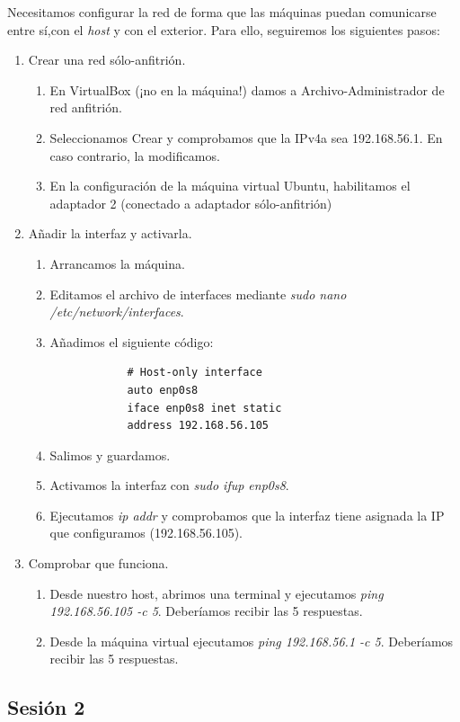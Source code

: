 \documentclass[12pt,spanish]{article}
\begin{document}
Necesitamos configurar la red de forma que las máquinas puedan comunicarse entre sí,con el \textit{host} y con el exterior. Para ello, seguiremos los siguientes pasos:
\begin{enumerate}
	\item Crear una red sólo-anfitrión.
	\begin{enumerate}
		\item En VirtualBox (¡no en la máquina!) damos a Archivo-Administrador de red anfitrión.
		\item Seleccionamos Crear y comprobamos que la IPv4a sea 192.168.56.1. En caso contrario, la modificamos.
		\item En la configuración de la máquina virtual Ubuntu, habilitamos el adaptador 2 (conectado a adaptador sólo-anfitrión)
	\end{enumerate}
	\item Añadir la interfaz y activarla.
	\begin{enumerate}
		\item Arrancamos la máquina.
		\item Editamos el archivo de interfaces mediante \textit{sudo nano /etc/network/interfaces}.
		\item Añadimos el siguiente código:
		\begin{lstlisting}
			# Host-only interface
			auto enp0s8
			iface enp0s8 inet static
			address 192.168.56.105
		\end{lstlisting}
		\item Salimos y guardamos.
		\item Activamos la interfaz con \textit{sudo ifup enp0s8}.
		\item Ejecutamos \textit{ip addr} y comprobamos que la interfaz tiene asignada la IP que configuramos (192.168.56.105).
	\end{enumerate}
	\item Comprobar que funciona.
		\begin{enumerate}
			\item Desde nuestro host, abrimos una terminal y ejecutamos \textit{ping 192.168.56.105 -c 5}. Deberíamos recibir las 5 respuestas.
			\item Desde la máquina virtual ejecutamos \textit{ping 192.168.56.1 -c 5}. Deberíamos recibir las 5 respuestas.
		\end{enumerate}
\end{enumerate}

\subsection{Sesión 2}
\end{document}
